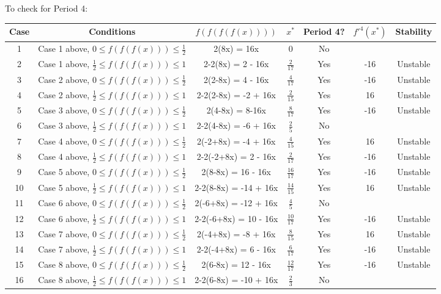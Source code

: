 \documentclass[12pt]{article}
\begin{document}
	\begin{table}[h!]
		\centering
		To check for Period 4:\\
		\bigskip
		\begin{tabular}{c|c||c|c|c|c|c}
			Case &Conditions & $f(f(f(f(x))))$ & $x^*$ & Period 4? & $f'^4(x^*)$ & Stability\\
			\hline
			1&Case 1 above, $0\leq f(f(f(x))) \leq \frac{1}{2}$  & 2(8x) = 16x & 0 & No & & \\
			2&Case 1 above, $\frac{1}{2} \leq f(f(f(x))) \leq 1$  & 2-2(8x) = 2 - 16x & $\frac{2}{17}$ & Yes &-16 & Unstable\\
			3&Case 2 above, $0\leq f(f(f(x))) \leq \frac{1}{2}$  & 2(2-8x) = 4 - 16x & $\frac{4}{17}$ & Yes &-16 & Unstable \\
			4&Case 2 above, $\frac{1}{2} \leq f(f(f(x))) \leq 1$  & 2-2(2-8x) = -2 + 16x & $\frac{2}{15}$ & Yes &16 & Unstable\\
			5&Case 3 above, $0\leq f(f(f(x))) \leq \frac{1}{2}$  & 2(4-8x) = 8-16x &$\frac{8}{17}$ & Yes &-16 & Unstable \\
			6&Case 3 above, $\frac{1}{2} \leq f(f(f(x))) \leq 1$  & 2-2(4-8x) = -6 + 16x & $\frac{2}{5}$ & No & &\\
			7&Case 4 above, $0\leq f(f(f(x))) \leq \frac{1}{2}$  & 2(-2+8x) = -4 + 16x & $\frac{4}{15}$ & Yes &16 & Unstable\\
			8&Case 4 above, $\frac{1}{2} \leq f(f(f(x))) \leq 1$  & 2-2(-2+8x) = 2 - 16x & $\frac{2}{17}$ & Yes &-16 & Unstable\\
			9&Case 5 above, $0\leq f(f(f(x))) \leq \frac{1}{2}$  & 2(8-8x) = 16 - 16x & $\frac{16}{17}$ & Yes &-16 & Unstable\\
			10&Case 5 above, $\frac{1}{2} \leq f(f(f(x))) \leq 1$  & 2-2(8-8x) = -14 + 16x & $\frac{14}{15}$ & Yes &16 & Unstable\\
			11&Case 6 above, $0\leq f(f(f(x))) \leq \frac{1}{2}$  & 2(-6+8x) = -12 + 16x & $\frac{4}{5}$ & No & & \\
			12&Case 6 above, $\frac{1}{2} \leq f(f(f(x))) \leq 1$  & 2-2(-6+8x) = 10 - 16x & $\frac{10}{17}$ & Yes &-16 & Unstable\\
			13&Case 7 above, $0\leq f(f(f(x))) \leq \frac{1}{2}$  & 2(-4+8x) = -8 + 16x & $\frac{8}{15}$ & Yes &16 & Unstable\\
			14&Case 7 above, $\frac{1}{2} \leq f(f(f(x))) \leq 1$  & 2-2(-4+8x) = 6 - 16x & $\frac{6}{17}$ & Yes &-16 & Unstable\\
			15&Case 8 above, $0\leq f(f(f(x))) \leq \frac{1}{2}$  & 2(6-8x) = 12 - 16x & $\frac{12}{17}$ & Yes &-16 & Unstable\\
			16&Case 8 above, $\frac{1}{2} \leq f(f(f(x))) \leq 1$  & 2-2(6-8x) = -10 + 16x & $\frac{2}{3}$ & No & & \\
		\end{tabular}
	\end{table}\\
\end{document}
